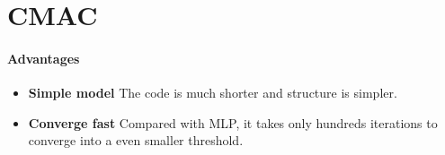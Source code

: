 \documentclass[
11pt, %
a4paper, %
oneside, %
headinclude%
BCOR3mm, %
]{scrartcl}
\begin{document}

\section{CMAC}
\paragraph{Advantages}
\begin{itemize}[noitemsep]
\item \textbf{Simple model}
The code is much shorter and structure is simpler.

\item \textbf{Converge fast}
Compared with MLP, it takes only hundreds iterations to converge into a even smaller threshold.
\end{itemize} 
\end{document}
